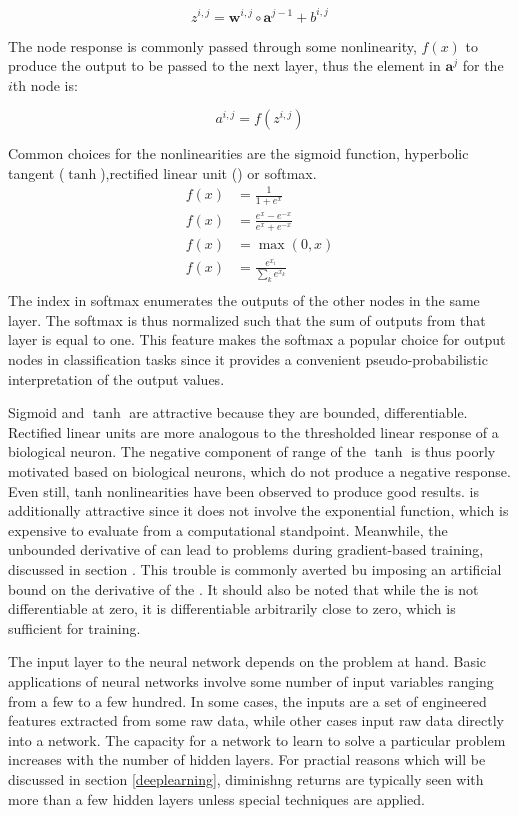 \begin{equation}
z^{i,j} = \mathbf{w}^{i,j} \circ \mathbf{a}^{j-1} + b^{i,j}
\end{equation}

The node response is commonly passed through some nonlinearity, $f(x)$ to produce the output to be passed to the next layer, thus the element in $\mathbf{a}^{j}$ for the $i$th node is:

\begin{equation}
a^{i, j} = f(z^{i,j})
\end{equation}

Common choices for the nonlinearities are the sigmoid function, hyperbolic tangent ($\tanh$),rectified linear unit (\relu) or softmax.
\begin{align}
f(x) &= \frac{1}{1+e^x}  \tag{Sigmoid}\\
f(x) &= \frac{e^x-e^{-x}}{e^x+e^{-x}} \tag{$\tanh$} \\
f(x) &= \max(0,x) \tag{\relu}  \\
f(x) &= \frac{e^{x_i}}{\sum_{k} e^{x_k}} \tag{Softmax}  \\
\end{align}
The index in softmax enumerates the outputs of the other nodes in the same layer.
The softmax is thus normalized such that the sum of outputs from that layer is equal to one.
This feature makes the softmax a popular choice for output nodes in classification tasks since it provides a convenient pseudo-probabilistic interpretation of the output values.

Sigmoid and $\tanh$ are attractive because they are bounded, differentiable.  Rectified linear units are more analogous to the thresholded linear response of a biological neuron.  The negative component of range of the $\tanh$ is thus poorly motivated based on biological neurons, which do not produce a negative response.
Even still, tanh nonlinearities have been observed to produce good results.
\relu is additionally attractive since it does not involve the exponential function, which is expensive to evaluate from a computational standpoint.
Meanwhile, the unbounded derivative of \relu can lead to problems during gradient-based training, discussed in section \label{backprop}.
This trouble is commonly averted bu imposing an artificial bound on the derivative of the \relu.
It should also be noted that while the \relu is not differentiable at zero, it is differentiable arbitrarily close to zero, which is sufficient for training.

The input layer to the neural network depends on the problem at hand.  Basic applications of neural networks involve some number of input variables ranging from a few to a few hundred.  In some cases, the inputs are a set of engineered features extracted from some raw data, while other cases input raw data directly into a network.  The capacity for a network to learn to solve a particular problem increases with the number of hidden layers.  For practial reasons which will be discussed in section \ref{deeplearning}, diminishng returns are typically seen with more than a few hidden layers unless special techniques are applied.


